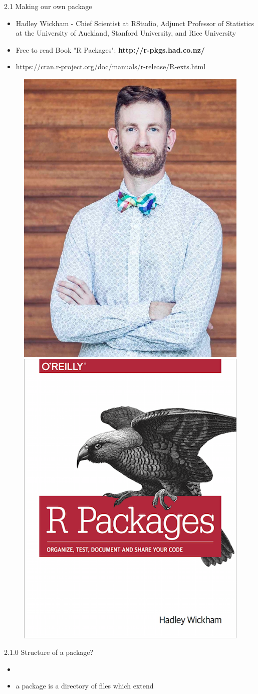 \documentclass[11pt,a4paper]{beamer}
\begin{document}
\begin{frame}[t]{2.1 Making our own package}
	
	\begin{itemize}
		\item Hadley Wickham - Chief Scientist at RStudio, Adjunct Professor of Statistics at the University of Auckland, Stanford University, and Rice University
		\item Free to read Book "R Packages": \textbf{http://r-pkgs.had.co.nz/}
		\item https://cran.r-project.org/doc/manuals/r-release/R-exts.html
			
	\end{itemize}

	\begin{figure}
	\centering
	\includegraphics[width=0.3\linewidth]{hadley}
	\includegraphics[width=0.3\linewidth]{cover}
	\label{fig:packages}
	\end{figure}

	
\end{frame}











\begin{frame}[t]{2.1.0 Structure of a package?}
	
	
	
	\begin{itemize}
		\item 
		\item a package is a directory of files which extend 
	
	
	\end{itemize}
	
\end{frame}
\end{document}
